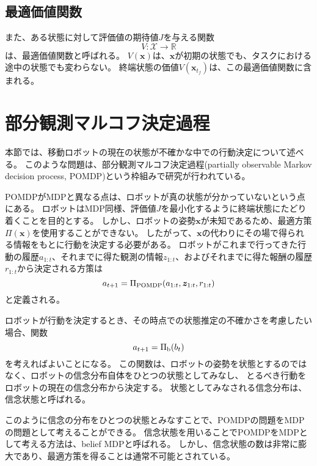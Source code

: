 \subsection{最適価値関数}
また、ある状態に対して評価値の期待値$J$を与える関数
\begin{equation}
\label{value function}
  V : \mathcal{X} \rightarrow \mathbb{R}
\end{equation}
は、最適価値関数と呼ばれる。
$V(\bm{x})$は、$\bm{x}$が初期の状態でも、タスクにおける途中の状態でも変わらない。
終端状態の価値$V(\bm{x}_{t_{f}})$は、この最適価値関数に含まれる。


\section{部分観測マルコフ決定過程}
本節では、移動ロボットの現在の状態が不確かな中での行動決定について述べる。
このような問題は、部分観測マルコフ決定過程(partially observable Markov decision process, POMDP)という枠組みで研究が行われている。

POMDPがMDPと異なる点は、ロボットが真の状態が分かっていないという点にある。
ロボットはMDP同様、評価値$J$を最小化するように終端状態にたどり着くことを目的とする。
しかし、ロボットの姿勢$\bm{x}$が未知であるため、最適方策$\Pi(\bm{x})$を使用することができない。
したがって、$\bm{x}$の代わりにその場で得られる情報をもとに行動を決定する必要がある。
ロボットがこれまで行ってきた行動の履歴$a_{1:t}$、それまでに得た観測の情報$z_{1:t}$、およびそれまでに得た報酬の履歴$r_{1:t}$から決定される方策は
\begin{equation}
\label{policy pomdp}
  a_{t+1} = \Pi_{\rm POMDP} (a_{1:t}, \bm{z}_{1:t}, r_{1:t})
\end{equation}
と定義される。

ロボットが行動を決定するとき、その時点での状態推定の不確かさを考慮したい場合、関数
\begin{equation}
\label{policy belief}
  a_{t+1} = \Pi_{\rm b} (b_{t})
\end{equation}
を考えればよいことになる。
この関数は、ロボットの姿勢を状態とするのではなく、ロボットの信念分布自体をひとつの状態としてみなし、
とるべき行動をロボットの現在の信念分布から決定する。
状態としてみなされる信念分布は、信念状態と呼ばれる。

このように信念の分布をひとつの状態とみなすことで、POMDPの問題をMDPの問題として考えることができる。
信念状態を用いることでPOMDPをMDPとして考える方法は、belief MDPと呼ばれる\cite{kaelbling1998}。
しかし、信念状態の数は非常に膨大であり、最適方策を得ることは通常不可能とされている。


